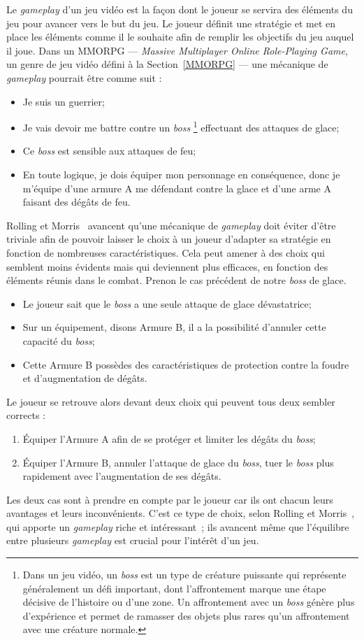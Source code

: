 Le \emph{gameplay} d'un jeu vidéo est la façon dont le joueur se servira des éléments du jeu pour avancer vers le but du jeu.
Le joueur définit une stratégie et met en place les éléments comme il le souhaite afin de remplir les objectifs du jeu auquel il joue.
Dans un MMORPG --- \emph{Massive Multiplayer Online Role-Playing Game}, un genre de jeu vidéo défini \`a la Section~\ref{MMORPG} --- une mécanique de \emph{gameplay} pourrait \^etre comme suit :
\begin{itemize}
    \item Je suis un guerrier;
    \item Je vais devoir me battre contre un \emph{boss}
\footnote{Dans un jeu vid\'eo, un \emph{boss} est un type de créature puissante qui représente généralement un défi important, dont l'affrontement marque une étape décisive de l'histoire ou d'une zone. Un affrontement avec un \emph{boss} génère plus d'expérience et permet de ramasser des objets plus rares qu'un affrontement avec une créature normale.}
% 
      effectuant des attaques de glace;
    \item Ce \emph{boss} est sensible aux attaques de feu;
    \item En toute logique, je dois équiper mon personnage en conséquence, donc 
     je m'équipe d'une armure A me défendant contre la glace et d'une arme A faisant des dégâts de feu.
\end{itemize}
Rolling et Morris~\cite{Rollings2004} avancent qu'une mécanique de \emph{gameplay} doit éviter d'être triviale afin de pouvoir laisser le choix à un joueur d'adapter sa stratégie en fonction de nombreuses caractéristiques.
Cela peut amener à des choix qui semblent moins évidents mais qui deviennent plus efficaces, en fonction des éléments réunis dans le combat.
Prenon le cas précédent de notre \emph{boss} de glace.
\begin{itemize}
    \item Le joueur sait que le \emph{boss} a une seule attaque de glace dévastatrice;
    \item Sur un équipement, disons Armure B, il a la possibilité d'annuler cette capacité du \emph{boss};
    \item Cette Armure B possèdes des caract\'eristiques de protection contre la foudre et d'augmentation de dégâts.
\end{itemize}
Le joueur se retrouve alors devant deux choix qui peuvent tous deux sembler corrects :
\begin{enumerate}
    \item Équiper l'Armure A afin de se protéger et limiter les dégâts du \emph{boss};
    \item Équiper l'Armure B, annuler l'attaque de glace du \emph{boss}, tuer le \emph{boss} plus rapidement avec l'augmentation de ses dégâts. 
\end{enumerate}
Les deux cas sont à prendre en compte par le joueur car ils ont chacun leurs avantages et leurs inconvénients.
C'est ce type de choix, selon Rolling et Morris~\cite{Rollings2004}, qui apporte un \emph{gameplay} riche et intéressant~;  
ils avancent même que l'équilibre entre plusieurs \emph{gameplay} est crucial pour l'int\'er\^et d'un jeu.

